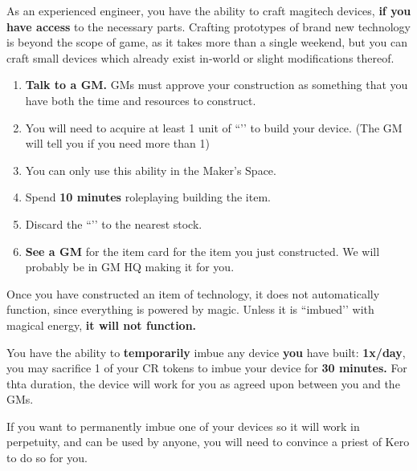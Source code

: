 \documentclass[green]{GL2020}
\begin{document}
\name{\gMagitechCrafting{}}

As an experienced engineer, you have the ability to craft magitech devices, \textbf{if you have access} to the necessary parts. Crafting prototypes of brand new technology is beyond the scope of game, as it takes more than a single weekend, but you can craft small devices which already exist in-world or slight modifications thereof. 

\begin{enumerate}
  \item \textbf{Talk to a GM.} GMs must approve your construction as something that you have both the time and resources to construct.
  \item You will need to acquire at least 1 unit of ``\iMagitechParts{}’’ to build your device. (The GM will tell you if you need more than 1) 
  \item You can only use this ability in the Maker’s Space. 
  \item Spend \textbf{10 minutes} roleplaying building the item. 
  \item Discard the ``\iMagitechParts{}’’ to the nearest stock. 
  \item \textbf{See a GM} for the item card for the item you just constructed. We will probably be in GM HQ making it for you.
\end{enumerate}

Once you have constructed an item of technology, it does not automatically function, since everything is powered by magic. Unless it is ``imbued’’ with magical energy, \textbf{it will not function.}

You have the ability to \textbf{temporarily} imbue any device \textbf{you} have built: \textbf{1x/day}, you may sacrifice 1 of your CR tokens to imbue your device for \textbf{30 minutes.} For thta duration, the device will work for you as agreed upon between you and the GMs.

If you want to permanently imbue one of your devices so it will work in perpetuity, and can be used by anyone, you will need to convince a priest of Kero to do so for you.
\end{document}
